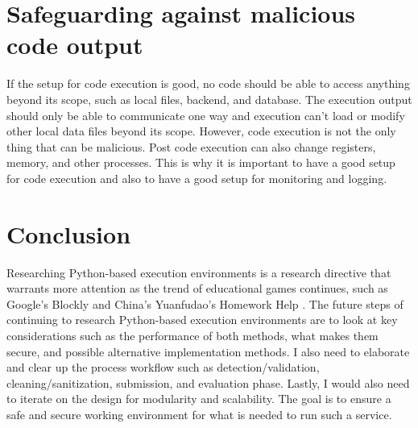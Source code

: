 \section{Safeguarding against malicious code output}
If the setup for code execution is good, no code should be able to access anything beyond its scope, such as local files, backend, and database. The execution output should only be able to communicate one way and execution can't load or modify other local data files beyond its scope. However, code execution is not the only thing that can be malicious. Post code execution can also change registers, memory, and other processes. This is why it is important to have a good setup for code execution and also to have a good setup for monitoring and logging.


\section{Conclusion}
Researching Python-based execution environments is a research directive that warrants more attention as the trend of educational games continues, such as Google’s Blockly \cite{google_blockly} and China’s Yuanfudao's Homework Help \cite{xiaoyuan_kousuan}.
The future steps of continuing to research Python-based execution environments are to look at key considerations such as the performance of both methods, what makes them secure, and possible alternative implementation methods. I also need to elaborate and clear up the process workflow such as detection/validation, cleaning/sanitization, submission, and evaluation phase. Lastly, I would also need to iterate on the design for modularity and scalability. The goal is to ensure a safe and secure working environment for what is needed to run such a service.